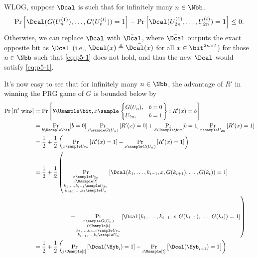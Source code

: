 \begin{answer}
    WLOG, suppose $\Dcal$ is such that for infinitely many $n\in\Nbb$,
    \begin{equation}\label{eq:p5-1}
        \Pr\left[\Dcal(G(U_n^{(1)}),\ldots,G(U_n^{(t)}))=1\right]-\Pr\left[\Dcal(U_{2n}^{(1)},\ldots,U_{2n}^{(t)})=1\right] \le 0.
    \end{equation}
    Otherwise,  we can replace $\Dcal$ with $\bar{\Dcal}$, where $\bar{\Dcal}$ outputs the exact opposite bit as $\Dcal$  (i.e., $\bar{\Dcal}(x)\triangleq \bar{\Dcal(x)}$ for all $x\in \bit^{2n\times t}$) for those $n\in\Nbb$ such that \eqref{eq:p5-1} does not hold, and thus the new $\Dcal$ would satisfy \eqref{eq:p5-1}.
    
    It's now easy to see that for infinitely many $n\in\Nbb$, the advantage of $R'$ in winning the PRG game of $G$ is bounded below by
    \begin{align*}
        \Pr\left[R' \textrm{ wins}\right]
        &= \Pr\left[b\Usample\bit, x\sample\left.\begin{cases}
            G(U_n), &b=0\\
            U_{2n}, & b=1
        \end{cases}\right\} : R'(x)=b \right]\\
        &=\Pr_{b\Usample\bit}[b=0]\Pr_{x\sample G(U_n)}\left[R'(x)=0\right] +\Pr_{b\Usample\bit}[b=1]\Pr_{x\sample U_{2n}}\left[R'(x)=1\right]\\
        &= \frac{1}{2}+\frac{1}{2}\left(\Pr_{x\sample U_{2n}}\left[R'(x)=1\right]-  \Pr_{x\sample G(U_n)}\left[R'(x)=1\right]\right)\\
        &= \frac{1}{2}+\frac{1}{2}\left(\Pr_{\substack{x\sample U_{2n}\\i\Usample [t] \\ k_1,\ldots,k_{i-1}\sample U_{2n}\\ k_{i+1},\ldots,k_t\sample U_{n}}}\left[ \Dcal(k_1,\ldots, k_{i-1}, x, G(k_{i+1}), \ldots, G(k_t))  =1\right]\right.\\
        &\qquad\qquad\qquad \left. - \Pr_{\substack{x\sample G(U_n)\\i\Usample [t] \\ k_1,\ldots,k_{i-1}\sample U_{2n}\\ k_{i+1},\ldots,k_t\sample U_{n}}}\left[   \Dcal(k_1,\ldots, k_{i-1}, x, G(k_{i+1}), \ldots, G(k_t))  =1\right]\right)\\
        &= \frac{1}{2}+\frac{1}{2}\left(\Pr_{i\Usample [t]}\left[ \Dcal(\Hyb_{i})  =1\right]
        -  \Pr_{i\Usample [t]}\left[   \Dcal(\Hyb_{i-1})  =1\right]\right)\\

\end{align*}
\end{answer}
